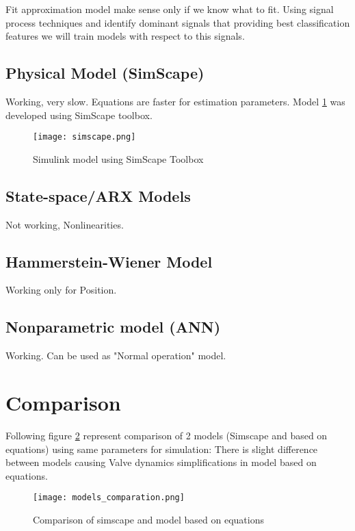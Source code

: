 Fit approximation model make sense only if we know what to fit. Using
signal process techniques and identify dominant signals that providing best
classification features we will train models with respect to this signals.

\subsection{Physical Model (SimScape)}
Working, very slow. Equations are faster for estimation parameters.
Model \ref{fig:model_simscape} was developed using SimScape toolbox.

\begin{figure}[h!]
    \centering
    \texttt{[image: simscape.png]}
    \caption{Simulink model using SimScape Toolbox}
    \label{fig:model_simscape}
\end{figure}

\subsection{State-space/ARX Models}
Not working, Nonlinearities.


\subsection{Hammerstein-Wiener Model}
Working only for Position.

\subsection{Nonparametric model (ANN)}

Working. Can be used as "Normal operation" model.



\section{Comparison}
Following figure \ref{fig:compare_of_models} represent comparison of 2 models
(Simscape and based on equations) using same parameters for simulation:
There is slight difference between models causing Valve dynamics
simplifications in model based on equations.

\begin{figure}[h!]
    \centering
    \texttt{[image: models\_comparation.png]}
    \caption{Comparison of simscape and model based on equations}
    \label{fig:compare_of_models}
\end{figure}


